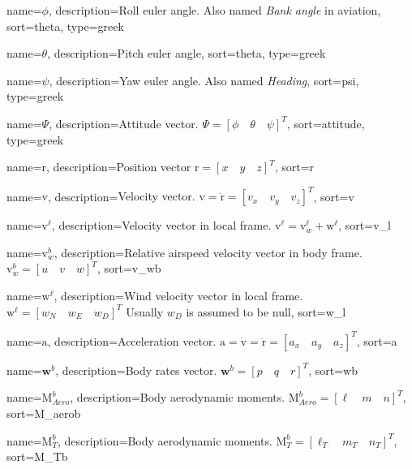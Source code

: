 {
	name={$\phi$},
  	description={Roll euler angle. Also named \textit{Bank angle} in aviation},
  	sort=theta,
	type=greek
}

{
	name={$\theta$},
  	description={Pitch euler angle},
  	sort=theta,
	type=greek
}

{
	name={$\psi$},
  	description={Yaw euler angle. Also named \textit{Heading}},
  	sort=psi,
	type=greek
}

{
	name={$\Psi$},
	description={Attitude vector. $\Psi = [\phi \quad \theta \quad \psi]^T$},
	sort=attitude,
	type=greek
}

{
	name={$\bm{\mathrm{r}}$},
	description={Position vector $\bm{\mathrm{r}} = [x \quad y \quad z]^{T}$},
  	sort=r
}

{
	name={$\bm{\mathrm{v}}$},
	description={Velocity vector. $\bm{\mathrm{v}} = \bm{\mathrm{\dot{r}}} = [v_x \quad v_y \quad v_z]^T$},
	sort=v
}

{
	name={$\bm{\mathrm{v}}^\ell$},
	description={Velocity vector in local frame. $\bm{\mathrm{v}}^\ell = \bm{\mathrm{v}}_w^\ell + \bm{\mathrm{w}}^\ell$},
	sort=v_l
}

{
	name={$\bm{\mathrm{v}}_w^b$},
	description={Relative airspeed velocity vector in body frame. $\bm{\mathrm{v}}_w^b = [u \quad v \quad w]^T$},
	sort=v_wb
}

{
	name={$\bm{\mathrm{w}}^\ell$},
	description={Wind velocity vector in local frame. $\bm{\mathrm{w}}^\ell = [w_N \quad w_E \quad w_D]^T$
				 Usually $w_D$ is assumed to be null},
	sort=w_l
}


{
	name={$\bm{\mathrm{a}}$},
	description={Acceleration vector. $\bm{\mathrm{a}} = \bm{\mathrm{\dot{v}}} = \bm{\mathrm{\ddot{r}}} = [a_x \quad a_y \quad a_z]^T$},
	sort=a
}

{
	name={$\bm{w}^b$},
	description={Body rates vector. $\bm{w}^b = [p \quad q \quad r]^T$},
	sort=wb
}

{
	name={$\bm{\mathrm{M}}_{Aero}^b$},
	description={Body aerodynamic moments. $\bm{\mathrm{M}}_{Aero}^b = [\ell \quad m \quad n]^T$},
	sort=M_aerob
}

{
	name={$\bm{\mathrm{M}}_T^b$},
	description={Body aerodynamic moments. $\bm{\mathrm{M}}_T^b = [\ell_T \quad m_T \quad n_T]^T$},
	sort=M_Tb
}

